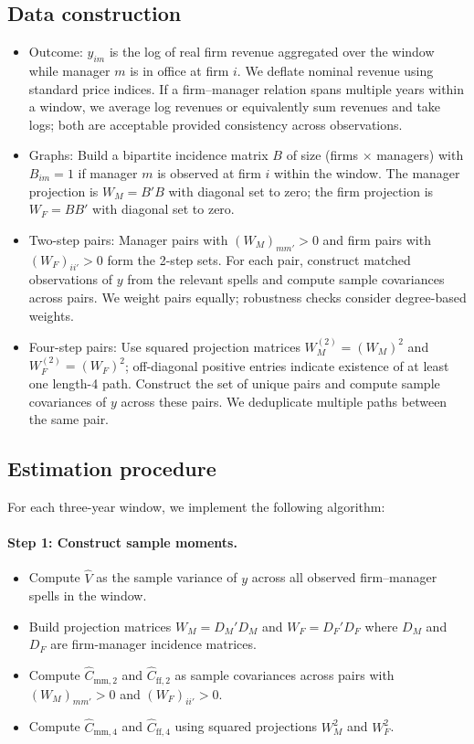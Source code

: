 \documentclass[11pt]{article}
\begin{document}
\subsection{Data construction}
\begin{itemize}
  \item Outcome: $y_{im}$ is the log of real firm revenue aggregated over the window while manager $m$ is in office at firm $i$. We deflate nominal revenue using standard price indices. If a firm--manager relation spans multiple years within a window, we average log revenues or equivalently sum revenues and take logs; both are acceptable provided consistency across observations.
  \item Graphs: Build a bipartite incidence matrix $B$ of size (firms $\times$ managers) with $B_{im}=1$ if manager $m$ is observed at firm $i$ within the window. The manager projection is $W_M = B'B$ with diagonal set to zero; the firm projection is $W_F = BB'$ with diagonal set to zero.
  \item Two-step pairs: Manager pairs with $(W_M)_{mm'}>0$ and firm pairs with $(W_F)_{ii'}>0$ form the 2-step sets. For each pair, construct matched observations of $y$ from the relevant spells and compute sample covariances across pairs. We weight pairs equally; robustness checks consider degree-based weights.
  \item Four-step pairs: Use squared projection matrices $W_M^{(2)}=(W_M)^2$ and $W_F^{(2)}=(W_F)^2$; off-diagonal positive entries indicate existence of at least one length-4 path. Construct the set of unique pairs and compute sample covariances of $y$ across these pairs. We deduplicate multiple paths between the same pair.
\end{itemize}

\subsection{Estimation procedure}
\label{sec:estimation-procedure}
For each three-year window, we implement the following algorithm:

\paragraph{Step 1: Construct sample moments.}
\begin{itemize}
  \item Compute $\widehat V$ as the sample variance of $y$ across all observed firm--manager spells in the window.
  \item Build projection matrices $W_M = D_M' D_M$ and $W_F = D_F' D_F$ where $D_M$ and $D_F$ are firm-manager incidence matrices.
  \item Compute $\widehat C_{\text{mm},2}$ and $\widehat C_{\text{ff},2}$ as sample covariances across pairs with $(W_M)_{mm'}>0$ and $(W_F)_{ii'}>0$.
  \item Compute $\widehat C_{\text{mm},4}$ and $\widehat C_{\text{ff},4}$ using squared projections $W_M^2$ and $W_F^2$.
\end{itemize}
\end{document}
